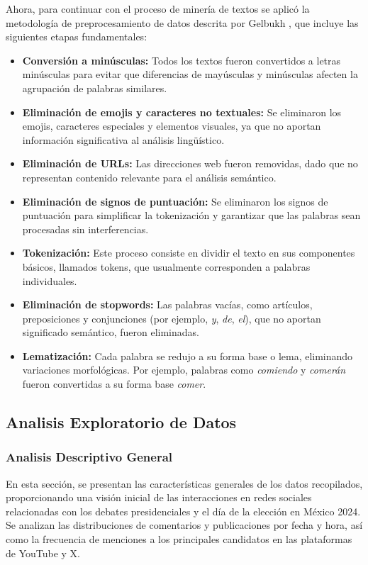 \documentclass[10pt, a4paper]{article}
\begin{document}
	Ahora, para continuar con el proceso de minería de textos se aplicó la metodología de preprocesamiento de datos descrita por Gelbukh \parencite{gelbukh2003procesamiento}, que incluye las siguientes etapas fundamentales:
	
	\begin{itemize}
		\item \textbf{Conversión a minúsculas:} Todos los textos fueron convertidos a letras minúsculas para evitar que diferencias de mayúsculas y minúsculas afecten la agrupación de palabras similares.
		
		\item \textbf{Eliminación de emojis y caracteres no textuales:} Se eliminaron los emojis, caracteres especiales y elementos visuales, ya que no aportan información significativa al análisis lingüístico.
		
		\item \textbf{Eliminación de URLs:} Las direcciones web fueron removidas, dado que no representan contenido relevante para el análisis semántico.
		
		\item \textbf{Eliminación de signos de puntuación:} Se eliminaron los signos de puntuación para simplificar la tokenización y garantizar que las palabras sean procesadas sin interferencias.
		
		\item \textbf{Tokenización:} Este proceso consiste en dividir el texto en sus componentes básicos, llamados tokens, que usualmente corresponden a palabras individuales.
		
		\item \textbf{Eliminación de stopwords:} Las palabras vacías, como artículos, preposiciones y conjunciones (por ejemplo, \textit{y}, \textit{de}, \textit{el}), que no aportan significado semántico, fueron eliminadas.
		
		\item \textbf{Lematización:} Cada palabra se redujo a su forma base o lema, eliminando variaciones morfológicas. Por ejemplo, palabras como \textit{comiendo} y \textit{comerán} fueron convertidas a su forma base \textit{comer}.
	\end{itemize}
	
	\subsection{Analisis Exploratorio de Datos}
	
	\subsubsection{Analisis Descriptivo General}
	En esta sección, se presentan las características generales de los datos recopilados, proporcionando una visión inicial de las interacciones en redes sociales relacionadas con los debates presidenciales y el día de la elección en México 2024. Se analizan las distribuciones de comentarios y publicaciones por fecha y hora, así como la frecuencia de menciones a los principales candidatos en las plataformas de YouTube y X.
	
\end{document}
